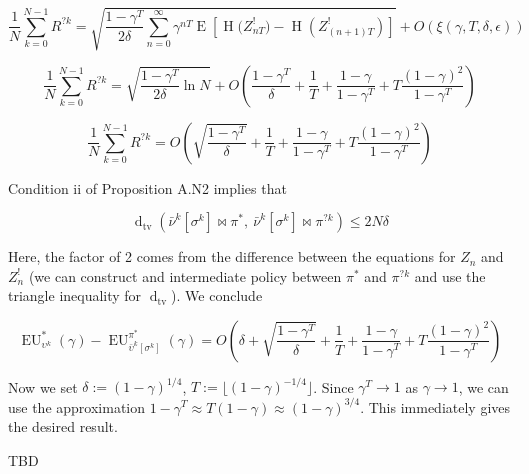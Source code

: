 \documentclass[a4paper]{article}
\newcommand{\E}[1]{\underset{#1}{\operatorname{E}}}
\newcommand{\Ent}{\operatorname{H}}
\newcommand{\Dtv}{\operatorname{d}_{\text{tv}}}
\newcommand{\Floor}[1]{\lfloor #1 \rfloor}
\newcommand{\EU}{\operatorname{EU}}
\begin{document}
$$\frac{1}{N}\sum_{k=0}^{N-1}R^{?k} = \sqrt{\frac{1-\gamma^T}{2\delta}\sum_{n=0}^\infty \gamma^{nT} \E{}\left[\Ent\Big(Z^!_{nT}\Big)-\Ent\left(Z^!_{(n+1)T}\right)\right]} + O\left(\xi(\gamma,T,\delta,\epsilon)\right)$$

$$\frac{1}{N}\sum_{k=0}^{N-1}R^{?k} = \sqrt{\frac{1-\gamma^T}{2\delta}\ln N} + O\left(\frac{1-\gamma^T}{\delta}+\frac{1}{T}+\frac{1-\gamma}{1-\gamma^T}+T\frac{(1-\gamma)^2}{1-\gamma^T}\right)$$

$$\frac{1}{N}\sum_{k=0}^{N-1}R^{?k} = O\left(\sqrt{\frac{1-\gamma^T}{\delta}} + \frac{1}{T}+\frac{1-\gamma}{1-\gamma^T}+T\frac{(1-\gamma)^2}{1-\gamma^T}\right)$$

Condition ii of Proposition A.N2 implies that

$$\Dtv\left(\bar{\nu}^k\left[\sigma^k\right]\bowtie\pi^*,\ \bar{\nu}^k\left[\sigma^k\right]\bowtie\pi^{?k}\right) \leq 2N\delta$$

Here, the factor of 2 comes from the difference between the equations for $Z_n$ and $Z^!_n$ (we can construct and intermediate policy between $\pi^*$ and $\pi^{?k}$ and use the triangle inequality for $\Dtv$). We conclude

$$\EU^*_{\upsilon^k}(\gamma)-\EU^{\pi^{*}}_{\bar{\upsilon}^k[\sigma^k]}(\gamma) = O\left(\delta+\sqrt{\frac{1-\gamma^T}{\delta}} +\frac{1}{T}+\frac{1-\gamma}{1-\gamma^T}+T\frac{(1-\gamma)^2}{1-\gamma^T}\right)$$

Now we set $\delta:=\left(1-\gamma\right)^{1/4}$,  $T:=\Floor{\left(1-\gamma\right)^{-1/4}}$. Since $\gamma^T \rightarrow 1$ as $\gamma \rightarrow 1$, we can use the approximation $1-\gamma^T \approx T(1-\gamma) \approx (1-\gamma)^{3/4}$. This immediately gives the desired result.

TBD
\end{document}
